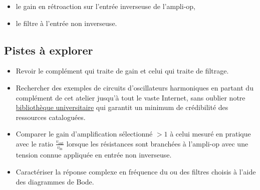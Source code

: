 \documentclass[canadien,12pt,oneside,letterpaper]{article}
\begin{document}
\begin{itemize}
    \item le gain en rétroaction sur l'entrée inverseuse de l'ampli-op,
    \item le filtre à l'entrée non inverseuse.
\end{itemize}

\subsection{Pistes à explorer}
\begin{itemize}
    \item Revoir le complément qui traite de gain et celui qui traite de filtrage.
    \item Rechercher des exemples de circuits d'oscillateurs harmoniques en partant du complément de cet atelier jusqu'à tout le vaste Internet, sans oublier notre \href{https://www.bibl.ulaval.ca}{bibliothèque universitaire} qui garantit un minimum de crédibilité des ressources cataloguées.
    \item Comparer le gain d'amplification sélectionné $>1$ à celui mesuré en pratique avec le ratio $\frac{v_{\text{out}}}{v_{\text{in}}}$ lorsque les résistances sont branchées à l'ampli-op avec une tension connue appliquée en entrée non inverseuse.
    \item Caractériser la réponse complexe en fréquence du ou des filtres choisis à l'aide des diagrammes de Bode.
\end{itemize}


\end{document}
